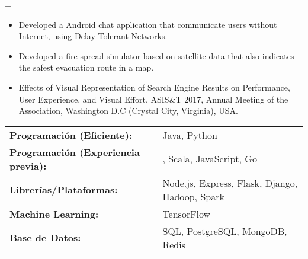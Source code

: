 \documentclass[10pt,letterpaper]{article}
\begin{document}
	\vspace{\separationAfterHeaderBeforeItem}
	\begin{itemize}
		\parskip=\separationBetweenItems
			\begin{itemize}[label=\textbullet]
				\itemsep0em
				\item Developed a Android chat application that communicate users without Internet, using Delay Tolerant Networks.
			\end{itemize}
	
		\vspace{\separationBetweenItems}	
			\begin{itemize}[label=\textbullet]
				\itemsep0em
				\item Developed a fire spread simulator based on satellite data that also indicates the safest evacuation route in a map.
			\end{itemize}

		\vspace{\separationBetweenItems}	
			\begin{itemize}[label=\textbullet]
				\itemsep0em
				\item Effects of Visual Representation of Search Engine Results on Performance, User Experience, and Visual Effort. ASIS\&T 2017,  Annual Meeting of the Association, Washington D.C (Crystal City, Virginia), USA.
			\end{itemize}
		\end{itemize}	

	\vspace{\separationBetweenSections}	
	\hspace{\hseparationBeforeTabular}
		\begin{tabular}{ l l }
		\textbullet\hspace{0.4em}\textbf{Programación (Eficiente):} & Java, Python \\
		\textbullet\hspace{0.4em}\textbf{Programación (Experiencia previa):} & \CPP, Scala, JavaScript, Go \\
		\textbullet\hspace{0.4em}\textbf{Librerías/Plataformas:} & Node.js, Express, Flask, Django, Hadoop, Spark \\
		\textbullet\hspace{0.4em}\textbf{Machine Learning:} & TensorFlow \\
		\textbullet\hspace{0.4em}\textbf{Base de Datos:} &SQL, PostgreSQL, MongoDB, Redis \\
		\end{tabular}
	
	
\end{document}
